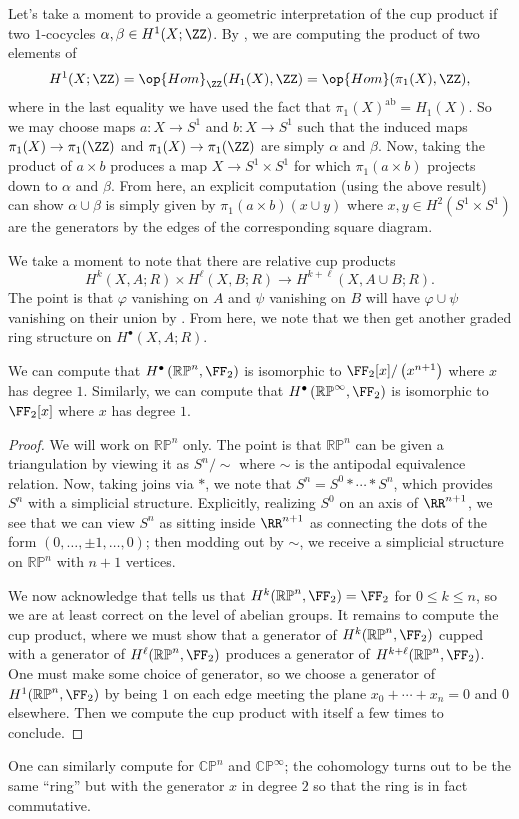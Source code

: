 \documentclass[../notes.tex]{subfiles}
\begin{document}
\begin{remark}
	Let's take a moment to provide a geometric interpretation of the cup product if two $1$-cocycles $\alpha,\beta\in H^1(X;\ZZ)$. By , we are computing the product of two elements of
	\[H^1(X;\ZZ)=\op{Hom}_\ZZ(H_1(X),\ZZ)=\op{Hom}(\pi_1(X),\ZZ),\]
	where in the last equality we have used the fact that $\pi_1(X)^{\mathrm{ab}}=H_1(X)$. So we may choose maps $a\colon X\to S^1$ and $b\colon X\to S^1$ such that the induced maps $\pi_1(X)\to\pi_1(\ZZ)$ and $\pi_1(X)\to\pi_1(\ZZ)$ are simply $\alpha$ and $\beta$. Now, taking the product of $a\times b$ produces a map $X\to S^1\times S^1$ for which $\pi_1(a\times b)$ projects down to $\alpha$ and $\beta$. From here, an explicit computation (using the above result) can show $\alpha\cup\beta$ is simply given by $\pi_1(a\times b)(x\cup y)$ where $x,y\in H^2\left(S^1\times S^1\right)$ are the generators by the edges of the corresponding square diagram.
\end{remark}
\begin{remark}
	We take a moment to note that there are relative cup products
	\[H^k(X,A;R)\times H^\ell(X,B;R)\to H^{k+\ell}(X,A\cup B;R).\]
	The point is that $\varphi$ vanishing on $A$ and $\psi$ vanishing on $B$ will have $\varphi\cup\psi$ vanishing on their union by . From here, we note that we then get another graded ring structure on $H^\bullet(X,A;R)$. 
\end{remark}
\begin{example}
	We can compute that $H^\bullet\left(\mathbb{RP}^n,\FF_2\right)$ is isomorphic to $\FF_2[x]/\left(x^{n+1}\right)$ where $x$ has degree $1$. Similarly, we can compute that $H^\bullet\left(\mathbb{RP}^\infty,\FF_2\right)$ is isomorphic to $\FF_2[x]$ where $x$ has degree $1$. 
\end{example}
\begin{proof}
	We will work on $\mathbb{RP}^n$ only. The point is that $\mathbb{RP}^n$ can be given a triangulation by viewing it as $S^n/{\sim}$ where $\sim$ is the antipodal equivalence relation. Now, taking joins via $*$, we note that $S^n=S^0*\cdots*S^n$, which provides $S^n$ with a simplicial structure. Explicitly, realizing $S^0$ on an axis of $\RR^{n+1}$, we see that we can view $S^n$ as sitting inside $\RR^{n+1}$ as connecting the dots of the form $(0,\ldots,\pm1,\ldots,0)$; then modding out by $\sim$, we receive a simplicial structure on $\mathbb{RP}^n$ with $n+1$ vertices.

	We now acknowledge that  tells us that $H^k(\mathbb{RP}^n,\FF_2)=\FF_2$ for $0\le k\le n$, so we are at least correct on the level of abelian groups. It remains to compute the cup product, where we must show that a generator of $H^k(\mathbb{RP}^n,\FF_2)$ cupped with a generator of $H^\ell(\mathbb{RP}^n,\FF_2)$ produces a generator of $H^{k+\ell}(\mathbb{RP}^n,\FF_2)$. One must make some choice of generator, so we choose a generator of $H^1(\mathbb{RP}^n,\FF_2)$ by being $1$ on each edge meeting the plane $x_0+\cdots+x_n=0$ and $0$ elsewhere. Then we compute the cup product with itself a few times to conclude.
\end{proof}
\begin{remark}
	One can similarly compute for $\mathbb{CP}^n$ and $\mathbb{CP}^\infty$; the cohomology turns out to be the same ``ring'' but with the generator $x$ in degree $2$ so that the ring is in fact commutative.
\end{remark}
\end{document}
